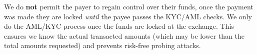 We do {\bf not} permit the payer to regain control over their funds, once the
payment was made they are locked {\em until} the payee passes the KYC/AML
checks.  We only do the AML/KYC process once the funds are locked at the
exchange. This ensures we know the actual transacted amounts (which may be
lower than the total amounts requested) and prevents risk-free probing
attacks.
